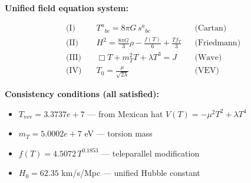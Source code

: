 
\textbf{Unified field equation system:}

\begin{align}
  \text{(I)} \quad & T^a{}_{bc} = 8\pi G \, s^a{}_{bc} && \text{(Cartan)} \\
  \text{(II)} \quad & H^2 = \frac{8\pi G}{3}\rho - \frac{f(T)}{6} + \frac{Tf_T}{3} && \text{(Friedmann)} \\
  \text{(III)} \quad & \Box T + m_T^2 T + \lambda T^3 = J && \text{(Wave)} \\
  \text{(IV)} \quad & T_0 = \frac{\mu}{\sqrt{2\lambda}} && \text{(VEV)}
\end{align}

\textbf{Consistency conditions (all satisfied):}
\begin{itemize}
  \item $T_{\text{vev}} = 3.3737e+7$ — from Mexican hat $V(T) = -\mu^2 T^2 + \lambda T^4$
  \item $m_T = 5.0002e+7$ eV — torsion mass
  \item $f(T) = 4.5072 \, T^{0.1853}$ — teleparallel modification
  \item $H_0 = 62.35$ km/s/Mpc — unified Hubble constant
\end{itemize}